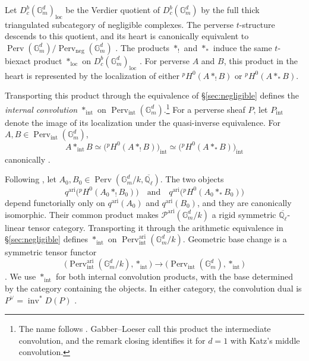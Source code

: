 \documentclass[12pt,reqno]{amsart}
\theoremstyle{definition}
\theoremstyle{plain}
\theoremstyle{definition}
\theoremstyle{remark}
\newcommand{\bbG}{\mathbb{G}}  \newcommand{\bbH}{\mathbb{H}}
\newcommand{\bbQ}{\mathbb{Q}}  \newcommand{\bbR}{\mathbb{R}}
\newcommand{\ol}[1]{\overline{#1}}
\newcommand{\Ql}{\bbQ_{\ell}}
\newcommand{\Db}{D^b_c}
\newcommand{\Gm}{\bbG_m}
\newcommand{\Perv}{\operatorname{Perv}}
\begin{document}
Let \(\Db(\Gm^d)_{\mathrm{loc}}\) be the Verdier quotient of \(\Db(\Gm^d)\) by the full thick triangulated
subcategory of negligible complexes.  The perverse \(t\)-structure descends to this quotient, and its
heart is canonically equivalent to \(\Perv(\Gm^d)/\Perv_{\mathrm{neg}}(\Gm^d)\)
\cite[Prop.~3.6.1]{GabberLoeser1996}.  The products \(\ast_!\) and \(\ast_*\) induce the same
\(t\)-biexact product \(\ast_{\mathrm{loc}}\) on \(\Db(\Gm^d)_{\mathrm{loc}}\)
\cite[Def.-Prop.~3.6.5]{GabberLoeser1996}.  For perverse \(A\) and \(B\), this product in the heart is
represented by the localization of either \({}^pH^0(A\ast_!B)\) or \({}^pH^0(A\ast_*B)\).

Transporting this product through the equivalence of \S\ref{sec:negligible} defines the
\emph{internal convolution} \(\ast_{\mathrm{int}}\) on \(\Perv_{\mathrm{int}}(\Gm^d)\).\footnote{The
name follows \cite[Def.~3.11]{ForeyFresanKowalski2021}.  Gabber--Loeser call this product the
intermediate convolution, and the remark closing \cite[\S3.7]{GabberLoeser1996} identifies it for
\(d=1\) with Katz's middle convolution.}  For a perverse
sheaf \(P\), let \(P_{\mathrm{int}}\) denote the image of its localization under the quasi-inverse
equivalence.  For \(A,B\in\Perv_{\mathrm{int}}(\Gm^d)\),
\[
        A\ast_{\mathrm{int}}B
        \simeq\bigl({}^pH^0(A\ast_!B)\bigr)_{\mathrm{int}}
        \simeq\bigl({}^pH^0(A\ast_*B)\bigr)_{\mathrm{int}}
\]
canonically \cite[Def.-Prop.~3.7.3]{GabberLoeser1996}.

Following \cite[\S3.8]{ForeyFresanKowalski2021}, let
\(A_0,B_0\in\Perv(\Gm^d/k,\ol\Ql)\).  The two objects
\[
 q^{\mathrm{ari}}\bigl({}^pH^0(A_0\ast_!B_0)\bigr)
 \quad\text{and}\quad
 q^{\mathrm{ari}}\bigl({}^pH^0(A_0\ast_*B_0)\bigr)
\]
depend functorially only on \(q^{\mathrm{ari}}(A_0)\) and \(q^{\mathrm{ari}}(B_0)\), and they are
canonically isomorphic.  Their common product makes
\(\mathcal P^{\mathrm{ari}}(\Gm^d/k)\) a rigid symmetric \(\ol\Ql\)-linear tensor category.
Transporting it through the arithmetic equivalence in \S\ref{sec:negligible} defines
\(\ast_{\mathrm{int}}\) on \(\Perv_{\mathrm{int}}^{\mathrm{ari}}(\Gm^d/k)\).  Geometric base change is a
symmetric tensor functor
\[
 \bigl(\Perv_{\mathrm{int}}^{\mathrm{ari}}(\Gm^d/k),\ast_{\mathrm{int}}\bigr)
 \longrightarrow
 \bigl(\Perv_{\mathrm{int}}(\Gm^d),\ast_{\mathrm{int}}\bigr)
\]
\cite[\S3.8]{ForeyFresanKowalski2021}.  We use \(\ast_{\mathrm{int}}\) for both internal convolution
products, with the base determined by the category containing the objects.  In either category, the
convolution dual is \(P^\vee=\operatorname{inv}^*D(P)\) \cite[\S1.5]{ForeyFresanKowalski2021}.
\end{document}
